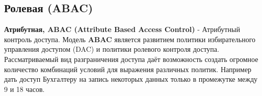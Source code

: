 \subsection{Ролевая (ABAC)}
\textbf{Атрибутная, ABAC (Attribute Based Access Control)} - Атрибутный контроль доступа. Модель \textbf{ABAC} является развитием политики избирательного управления доступом (DAC) и политики ролевого контроля доступа. Рассматриваемый вид разграничения доступа даёт возможность создать огромное количество комбинаций условий для выражения различных политик. Например дать доступ Бухгалтеру на запись некоторых данных только в промежутке между 9 и 18 часов.



